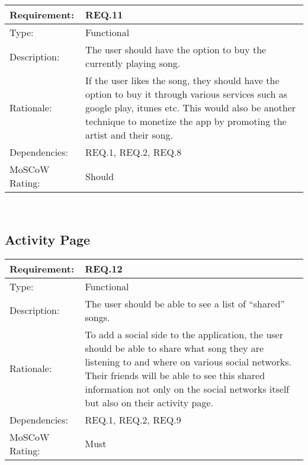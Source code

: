 \vspace{0.5cm}

\noindent
\begin{tabular}{|l || p{12.0cm}|}
  \hline
  Requirement:       & REQ.11 \\ \hline
  Type:              & Functional \\ \hline
  Description:       & The user should have the option to buy the currently playing song. \\ \hline
  Rationale:         & If the user likes the song, they should have the option to buy it through various services such as google play, itunes etc. This would also be another technique to monetize the app by promoting the artist and their song.    \\ \hline
  Dependencies:      & REQ.1, REQ.2, REQ.8  \\ \hline
  MoSCoW Rating:     & Should \\ \hline
\end{tabular}\\

\vspace{0.5cm}
\subsection*{Activity Page}

\noindent
\begin{tabular}{|l || p{12.0cm}|}
  \hline
  Requirement:       & REQ.12 \\ \hline
  Type:              & Functional \\ \hline
  Description:       & The user should be able to see a list of “shared” songs.   \\ \hline
  Rationale:         & To add a social side to the application, the user should be able to share what song they are listening to and where on various social networks. Their friends will be able to see this shared information not only on the social networks itself but also on their activity page. \\ \hline
  Dependencies:      & REQ.1, REQ.2, REQ.9 \\ \hline
  MoSCoW Rating:     & Must \\ \hline
\end{tabular}\\

\vspace{0.5cm}

